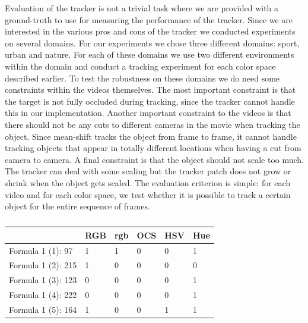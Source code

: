 \documentclass[a4paper,11pt]{article}
\begin{document}
		Evaluation of the tracker is not a trivial task where we are provided with a ground-truth
		to use for measuring the performance of the tracker. Since we are interested in the various
		pros and cons of the tracker we conducted experiments on several domains. For our experiments
		we chose three different domains: sport, urban and nature. For each of these domains we use
		two different environments within the domain and conduct a tracking experiment for each color
		space described earlier. To test the robustness on these domains we do need some constraints
		within the videos themselves. The most important constraint is that the target is not fully
		occluded during tracking, since the tracker cannot handle this in our implementation. Another
		important constraint to the videos is that there should not be any cuts to different cameras
		in the movie when tracking the object. Since mean-shift tracks the object from frame to frame,
		it cannot handle tracking objects that appear in totally different locations when having a cut
		from camera to camera. A final constraint is that the object should not scale too much. The
		tracker can deal with some scaling but the tracker patch does not grow or shrink when the object
		gets scaled. The evaluation criterion is simple: for each video and for each color space, we test
		whether it is possible to track a certain object for the entire sequence of frames.
		\begin{table}[H]
			\centering
			\begin{tabular}{ | l | l | l | l | l | l |}
			\hline
			                   & RGB & rgb & OCS & HSV & Hue \\
			\hline
			Formula 1 (1):  97 & 1   & 1   & 0   & 0   & 1 \\
			Formula 1 (2): 215 & 1   & 0   & 0   & 0   & 0 \\
			Formula 1 (3): 123 & 0   & 0   & 0   & 0   & 1 \\
			Formula 1 (4): 222 & 0   & 0   & 0   & 0   & 1 \\
			Formula 1 (5): 164 & 1   & 0   & 0   & 1   & 1 \\
			\hline
			\end{tabular}
			\caption{}
		\end{table}
\end{document}
